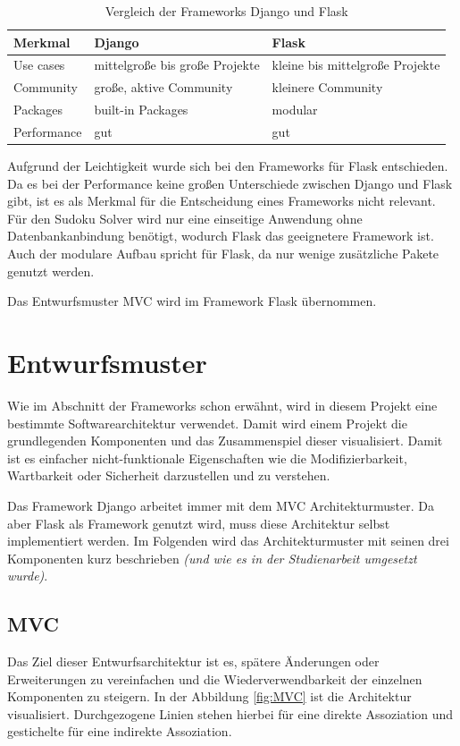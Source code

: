 \begin{table}[htbp]
	\centering
	\begin{tabular}{p{\colWidth}p{\colWidth} p{\colWidth}}
		\hline
		Merkmal & Django & Flask \\
		\hline
		Use cases & mittelgroße bis große Projekte & kleine bis mittelgroße \newline Projekte \\
		Community & große, aktive Community & kleinere Community \\
		Packages & built-in Packages & modular \\
		Performance & gut & gut \\

		\hline
	\end{tabular}
	\caption[Tabelle]{Vergleich der Frameworks Django und Flask}
	\label{tab:FrameworkVergleich}
\end{table}

Aufgrund der Leichtigkeit wurde sich bei den Frameworks für Flask entschieden. Da es bei der Performance keine großen Unterschiede zwischen Django und Flask gibt, ist es als Merkmal für die Entscheidung eines Frameworks nicht relevant. Für den Sudoku Solver wird nur eine einseitige Anwendung ohne Datenbankanbindung benötigt, wodurch Flask das geeignetere Framework ist. Auch der modulare Aufbau spricht für Flask, da nur wenige zusätzliche Pakete genutzt werden. 

Das Entwurfsmuster \ac{MVC} wird im Framework Flask übernommen.

\section{Entwurfsmuster}
Wie im Abschnitt der Frameworks schon erwähnt, wird in diesem Projekt eine bestimmte Softwarearchitektur verwendet. Damit wird einem Projekt die grundlegenden Komponenten und das Zusammenspiel dieser visualisiert. Damit ist es einfacher nicht-funktionale Eigenschaften wie die Modifizierbarkeit, Wartbarkeit oder Sicherheit darzustellen und zu verstehen.

Das Framework Django arbeitet immer mit dem \ac{MVC} Architekturmuster. Da aber Flask als Framework genutzt wird, muss diese Architektur selbst implementiert werden. Im Folgenden wird das Architekturmuster mit seinen drei Komponenten kurz beschrieben \textit{(und wie es in der Studienarbeit umgesetzt wurde)}.

\subsection{\acl{MVC}}
Das Ziel dieser Entwurfsarchitektur ist es, spätere Änderungen oder Erweiterungen zu vereinfachen und die Wiederverwendbarkeit der einzelnen Komponenten zu steigern. In der Abbildung \ref{fig:MVC} ist die Architektur visualisiert. Durchgezogene Linien stehen hierbei für eine direkte Assoziation und gestichelte für eine indirekte Assoziation.  

